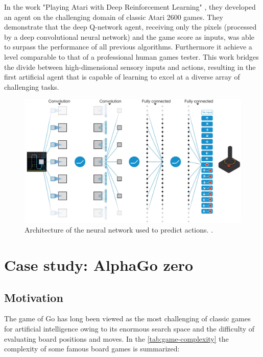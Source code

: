 \documentclass{article}
\begin{document}
In the work "Playing Atari with Deep Reinforcement Learning" \cite{mnih2013atari}, they developed an agent on the challenging domain of classic Atari 2600 games. They demonstrate that the deep Q-network agent, receiving only the pixels (processed by a deep convolutional neural network) and the game score as inputs, was able to surpass the performance of all previous algorithms. Furthermore it achieve a level comparable to that of a professional human games tester. This work bridges the divide between high-dimensional sensory inputs and actions, resulting in the first artificial agent that is capable of learning to excel at a diverse array of challenging tasks.

\begin{figure}[h]
	\centering
	\includegraphics[width=14cm]{dqn-architecture.png}
	\caption{Architecture of the neural network used to predict actions. \cite{mnih2013atari}.}
	\label{fig:dqn-architecture.png}
\end{figure}



\section{Case study: AlphaGo zero}
\subsection{Motivation}
The game of Go has long been viewed as the most challenging of classic games for artificial intelligence owing to its enormous search space and the difficulty of evaluating board positions and moves. In the \autoref{tab:game-complexity} the complexity of some famous board games is summarized:
\end{document}

